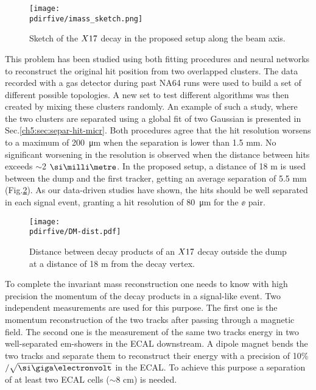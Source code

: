 \begin{figure}[bth!]
  \centering
  \texttt{[image: \\pdirfive/imass\_sketch.png]}
  \caption[Invariant mass reconstruction sketch]{Sketch of the $X17$ decay in the proposed setup along the beam axis.}
  \label{fig:imass_sketch}
\end{figure}


This problem has been studied using both fitting procedures and neural networks to reconstruct the original hit position from two overlapped clusters. The data recorded with a gas detector during past NA64 runs were used to build a set of different possible topologies. A new set to test different algorithms was then created by mixing these clusters randomly. An example of such a study, where the two clusters are separated using a global fit of two Gaussian is presented in Sec.\ref{ch5:sec:separ-hit-micr}. Both procedures agree that the hit resolution worsens to a maximum of \SI{200}{\micro\meter} when the separation is lower than 1.5 mm. No significant worsening in the resolution is observed when the distance between hits exceeds $\sim$2 $\mmi$. In the proposed setup, a distance of 18 m is used between the dump and the first tracker, getting an average separation of 5.5 mm (Fig.\ref{fig:dm_dist1}). As our data-driven studies have shown, the hits should be well separated in each signal event, granting a hit resolution of \SI{80}{\micro\meter} for the $\ee$ pair.

\begin{figure}[tbh!]
  \centering
  \texttt{[image: \\pdirfive/DM-dist.pdf]}
  \caption[Distance of the decay products of X17 in the 2021 setup]{Distance between decay products of an $X17$ decay outside the dump at a distance of 18 m from the decay vertex.}
  \label{fig:dm_dist1}
\end{figure}

To complete the invariant mass reconstruction one needs to know with high precision the momentum of the decay products in a signal-like event. Two independent measurements are used for this purpose. The first one is the momentum reconstruction of the two tracks after passing through a magnetic field. The second one is the measurement of the same two tracks energy in two well-separated em-showers in the ECAL downstream. A dipole magnet bends the two tracks and separate them to reconstruct their energy with a precision of 10\%$/\sqrt{\gev}$ in the ECAL. To achieve this purpose a separation of at least two ECAL cells ($\sim 8$ \si{\centi\meter}) is needed.

